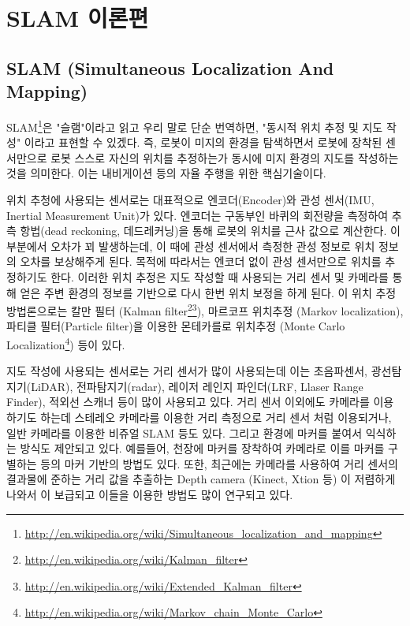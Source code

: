 \section{SLAM 이론편}

\subsection{SLAM (Simultaneous Localization And Mapping)}

SLAM\footnote{\url{http://en.wikipedia.org/wiki/Simultaneous_localization_and_mapping}}은 "슬램"이라고 읽고 우리 말로 단순 번역하면, "동시적 위치 추정 및 지도 작성" 이라고 표현할 수 있겠다. 즉, 로봇이 미지의 환경을 탐색하면서 로봇에 장착된 센서만으로 로봇 스스로 자신의 위치를 추정하는가 동시에 미지 환경의 지도를 작성하는 것을 의미한다. 이는 내비게이션 등의 자율 주행을 위한 핵심기술이다.

위치 추청에 사용되는 센서로는 대표적으로 엔코더(Encoder)와 관성 센서(IMU, Inertial Measurement Unit)가 있다. 엔코더는 구동부인 바퀴의 회전량을 측정하여 추측 항법(dead reckoning, 데드레커닝)을 통해 로봇의 위치를 근사 값으로 계산한다. 이 부분에서 오차가 꾀 발생하는데, 이 때에 관성 센서에서 측정한 관성 정보로 위치 정보의 오차를 보상해주게 된다. 목적에 따라서는 엔코더 없이 관성 센서만으로 위치를 추정하기도 한다. 이러한 위치 추정은 지도 작성할 때 사용되는 거리 센서 및 카메라를 통해 얻은 주변 환경의 정보를 기반으로 다시 한번 위치 보정을 하게 된다. 이 위치 추정 방법론으로는 칼만 필터 (Kalman filter\footnote{\url{http://en.wikipedia.org/wiki/Kalman_filter}}\footnote{\url{http://en.wikipedia.org/wiki/Extended_Kalman_filter}}), 마르코프 위치추정 (Markov localization), 파티클 필터(Particle filter)을 이용한 몬테카를로 위치추정 (Monte Carlo Localization\footnote{\url{http://en.wikipedia.org/wiki/Markov_chain_Monte_Carlo}}) 등이 있다.

지도 작성에 사용되는 센서로는 거리 센서가 많이 사용되는데 이는 초음파센서, 광선탐지기(LiDAR), 전파탐지기(radar), 레이저 레인지 파인더(LRF, Llaser Range Finder), 적외선 스캐너 등이 많이 사용되고 있다. 거리 센서 이외에도 카메라를 이용하기도 하는데 스테레오 카메라를 이용한 거리 측정으로 거리 센서 처럼 이용되거나, 일반 카메라를 이용한 비쥬얼 SLAM 등도 있다. 그리고 환경에 마커를 붙여서 익식하는 방식도 제안되고 있다. 예를들어, 천장에 마커를 장착하여 카메라로 이를 마커를 구별하는 등의 마커 기반의 방법도 있다. 또한, 최근에는 카메라를 사용하여 거리 센서의 결과물에 준하는 거리 값을 추출하는 Depth camera (Kinect, Xtion 등) 이 저렴하게 나와서 이 보급되고 이들을 이용한 방법도 많이 연구되고 있다.


